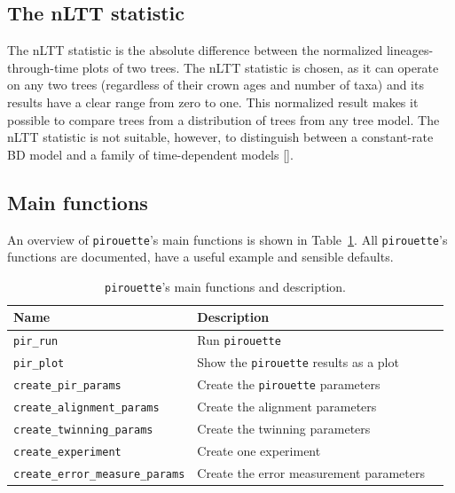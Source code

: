 \subsection{The nLTT statistic}
\label{subsec:nltt}

The nLTT statistic is the absolute difference
between the normalized lineages-through-time plots of two trees.
The nLTT statistic is chosen, as it can operate on any two trees (regardless
of their crown ages and number of taxa) and its results have a clear range
from zero to one. This normalized result makes it possible to compare trees 
from a distribution of trees from any tree model.
The nLTT statistic is not suitable, however, to distinguish
between a constant-rate BD model and a family of time-dependent 
models [\cite{louca2020extant}].

\subsection{Main functions}
\label{subsec:main_functions}

An overview of \verb;pirouette;'s main functions is shown in 
Table~\ref{tab:functions}. 
All \verb;pirouette;'s functions are documented,
have a useful example and sensible defaults.

\begin{table}[h]
  \centering
  \begin{tabular}{ | l | l | l | }
    \hline
    \textbf{Name} & \textbf{Description} \\
    \hline
    \verb;pir_run; & Run \verb;pirouette; \\
    \verb;pir_plot; & Show the \verb;pirouette; results as a plot  \\
    \verb;create_pir_params; & Create the \verb;pirouette; parameters  \\
    \hline
    \verb;create_alignment_params; & Create the alignment parameters  \\
    \verb;create_twinning_params; & Create the twinning parameters  \\
    \verb;create_experiment; & Create one experiment  \\
    \verb;create_error_measure_params; & Create the error measurement parameters  \\
    \hline
  \end{tabular}
  \caption{
    \texttt{pirouette}'s main functions and description. 
  }
  \label{tab:functions}
\end{table}


